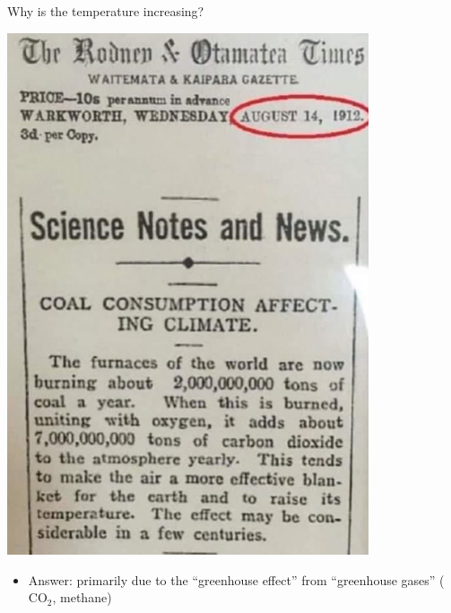 \documentclass[12pt]{beamer}
\begin{document}
\begin{frame}{Why is the temperature increasing?}
\begin{center}
\begin{minipage}{0.4\textwidth}
\end{minipage} %
\hfill %
\begin{minipage}{0.5\textwidth}
\vspace{0pt}
\includegraphics[width=0.8\textwidth]{images/rodnen-otamatea-times_climate-change_1912.jpeg}
\end{minipage}
\end{center}
%


\begin{itemize}
\item Answer: primarily due to the ``greenhouse effect'' from ``greenhouse gases'' ($\text{CO}_2$, methane)
\end{itemize}

\end{frame}
\end{document}
